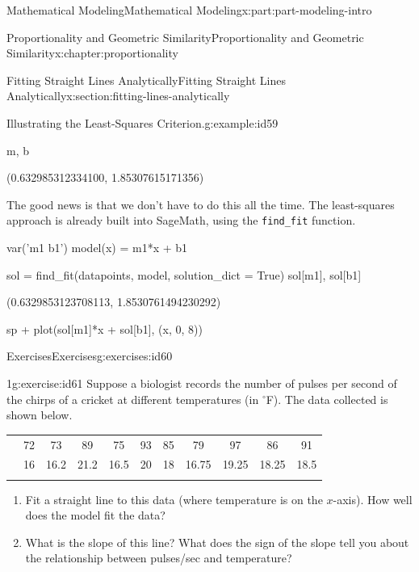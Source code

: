 \documentclass[oneside,10pt,]{book}
\newcommand{\tabularfont}{\relax}
\newcommand{\mono}[1]{\texttt{#1}}
\numberwithin{equation}{section}
\newcommand{\hrulethin}  {\noalign{\hrule height 0.04em}}
\newcommand{\hrulethick} {\noalign{\hrule height 0.11em}}
\begin{document}
\begin{partptx}{Mathematical Modeling}{}{Mathematical Modeling}{}{}{x:part:part-modeling-intro}
\begin{chapterptx}{Proportionality and Geometric Similarity}{}{Proportionality and Geometric Similarity}{}{}{x:chapter:proportionality}
\begin{sectionptx}{Fitting Straight Lines Analytically}{}{Fitting Straight Lines Analytically}{}{}{x:section:fitting-lines-analytically}
\begin{example}{Illustrating the Least-Squares Criterion.}{g:example:id59}
\begin{sageinput}
m, b
\end{sageinput}
\begin{sageoutput}
(0.632985312334100, 1.85307615171356)
\end{sageoutput}
The good news is that we don't have to do this all the time. The least-squares approach is already built into SageMath, using the \mono{find\_fit} function.%
\begin{sageinput}
var('m1 b1')
model(x) = m1*x + b1
\end{sageinput}
\begin{sageinput}
sol = find_fit(datapoints, model, solution_dict = True)
sol[m1], sol[b1]
\end{sageinput}
\begin{sageoutput}
(0.6329853123708113, 1.8530761494230292)
\end{sageoutput}
\begin{sageinput}
sp + plot(sol[m1]*x + sol[b1], (x, 0, 8))
\end{sageinput}
\end{example}
%
%
\typeout{************************************************}
\typeout{************************************************}
%
\begin{exercises-subsection-numberless}{Exercises}{}{Exercises}{}{}{g:exercises:id60}
\begin{divisionexercise}{1}{}{}{g:exercise:id61}%
Suppose a biologist records the number of pulses per second of the chirps of a cricket at different temperatures (in \({}^\circ\)F). The data collected is shown below.%
\begin{center}%
{\tabularfont%
\begin{tabular}{ccccccccccc}\hrulethick
\multicolumn{1}{rA}{\emph{Temperature}}&72&73&89&75&93&85&79&97&86&91\tabularnewline\hrulethin
\multicolumn{1}{rA}{\emph{Pulses\slash{}sec}}&16&16.2&21.2&16.5&20&18&16.75&19.25&18.25&18.5\tabularnewline\hrulethick
\end{tabular}
}%
\end{center}%
\begin{enumerate}[font=\bfseries,label=(\alph*),ref=\alph*]
\item{}Fit a straight line to this data (where temperature is on the \(x\)-axis). How well does the model fit the data?%
\item{}What is the slope of this line? What does the sign of the slope tell you about the relationship between pulses\slash{}sec and temperature?%
\end{enumerate}
\end{divisionexercise}%

\end{exercises-subsection-numberless}
\end{sectionptx}
\end{chapterptx}
\end{partptx}
\end{document}
